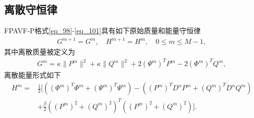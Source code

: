 \subsection{离散守恒律}
\begin{theorem}\label{thm4}
	FPAVF-P格式\eqref{eq_98}-\eqref{eq_101}具有如下原始质量和能量守恒律
\begin{align}\label{eq_11141}
G^{m+1}=G^{m}, \quad H^{m+1}=H^{m}, \quad 0 \leq m \leq M-1,
\end{align}
其中离散质量被定义为
\begin{align}\label{eq_11142}
G^{m}=\kappa\|P^{m}\|^2+\kappa\|Q^{m}\|^2+2 \left(\Psi^{m}\right)^T P^{m}-2 \left(\varPhi^{m}\right)^T Q^{m},
\end{align}
离散能量形式如下
\begin{align}
H^{m}=&\frac{1}{2}[((\varPhi^{m})^{T}\varPhi^{m}+(\Psi^{m})^{T}\Psi^{m})-((P^{m})^{T} D^{\alpha} P^{m}+(Q^{m})^{T} D^{\alpha} Q^{m})\nonumber\\
&+\frac{\beta}{2}((P^{m})^2+(Q^{m})^2)^{T}((P^{m})^2+(Q^{m})^2)].\label{eq_800}
\end{align}
\end{theorem}

